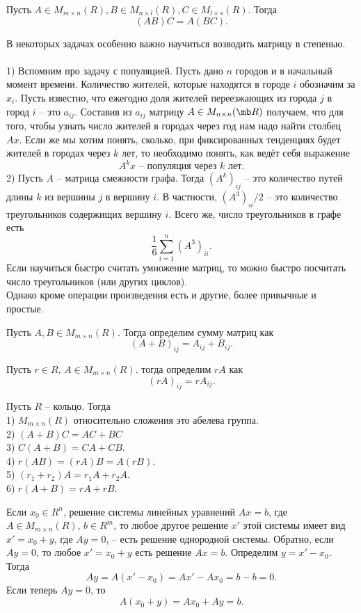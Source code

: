 \utv Пусть $A\in M_{m\times n}(R), B \in M_{n\times l}(R), C\in M_{l\times s}(R)$. Тогда
$$(AB)C= A(BC).$$
\eutv

\noindent В некоторых задачах особенно важно научиться возводить матрицу в степенью.\\
\exm\\
1) Вспомним про задачу с популяцией. Пусть дано $n$ городов и в начальный момент времени. Количество жителей, которые находятся в городе $i$ обозначим за $x_i$. Пусть известно, что ежегодно доля жителей переезжающих из города $j$ в город $i$ -- это $a_{ij}$. Составив из $a_{ij}$ матрицу $A\in M_{n\times n}(\mb R)$ получаем, что для того, чтобы узнать число жителей в городах через год нам надо найти столбец $Ax$. Если же мы хотим понять, сколько, при фиксированных тенденциях будет жителей в городах через $k$ лет, то необходимо понять, как ведёт себя выражение 
$$A^k x \text{ -- популяция через $k$ лет}.$$
2) Пусть $A$ -- матрица смежности графа. Тогда $(A^k)_{ij}$ -- это количество путей длины $k$ из вершины $j$ в вершину $i$. В частности, $(A^3)_{ii}/2$ -- это количество треугольников  содержищих вершину $i$. Всего же, число треугольников в графе есть 
$$\frac{1}{6}\sum_{i=1}^n (A^3)_{ii}.$$
Если научиться быстро считать умножение матриц, то можно быстро посчитать число треугольников (или других циклов).\\

Однако кроме операции произведения есть и другие, более привычные и простые.

\dfn Пусть $A,B\in M_{m\times n}(R)$. Тогда определим сумму матриц как 
$$(A+B)_{ij}=A_{ij}+B_{ij}.$$
\edfn

\dfn Пусть $r\in R$, $A\in M_{m\times n}(R)$. тогда определим $rA$ как 
$$(rA)_{ij}=rA_{ij}.$$
\edfn

\utv Пусть $R$ -- кольцо. Тогда\\
1) $M_{m\times n}(R)$ относительно сложения это абелева группа.\\
2) $(A+B)C=AC+BC$\\
3) $C(A+B)=CA+CB$.\\
4) $r(AB)=(rA)B=A(rB)$.\\
5) $(r_1+r_2)A=r_1A+r_2A$.\\
6) $r(A+B)=rA+rB$.
\eutv

\crl Если $x_0\in R^n$, решение системы линейных уравнений $Ax=b$, где $A\in M_{m\times n}(R)$, $b\in R^m$, то любое другое решение $x'$ этой системы имеет вид $x'=x_0+y$, где $Ay=0$, -- есть решение однородной системы. Обратно, если $Ay=0$, то любое $x'=x_0+y$ есть решение  $Ax=b$.
\proof Определим $y=x'-x_0$. Тогда $$Ay=A(x'-x_0)=Ax'-Ax_0=b-b=0.$$
Если теперь $Ay=0$, то 
$$A(x_0+y)=Ax_0+Ay=b.$$

